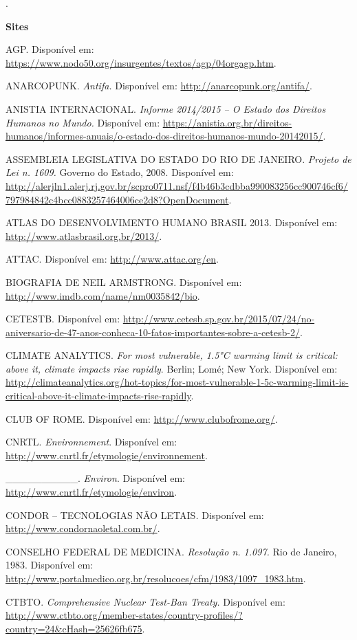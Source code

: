 .

\textbf{Sites}

AGP. Disponível em:
\href{https://www.nodo50.org/insurgentes/textos/agp/04orgagp.htm}{{https://www.nodo50.org/insurgentes/textos/agp/04orgagp.htm}}.

ANARCOPUNK. \emph{Antifa.} Disponível em:
\url{http://anarcopunk.org/antifa/}.

ANISTIA INTERNACIONAL. \emph{Informe 2014/2015 -- O Estado dos Direitos
Humanos no Mundo.} Disponível em:
\url{https://anistia.org.br/direitos-humanos/informes-anuais/o-estado-dos-direitos-humanos-mundo-20142015/}.

ASSEMBLEIA LEGISLATIVA DO ESTADO DO RIO DE JANEIRO. \emph{Projeto de Lei
n. 1609.} Governo do Estado, 2008. Disponível em:
\url{http://alerjln1.alerj.rj.gov.br/scpro0711.nsf/f4b46b3cdbba990083256cc900746cf6/797984842c4bcc0883257464006ce2d8?OpenDocument}.

ATLAS DO DESENVOLVIMENTO HUMANO BRASIL 2013. Disponível em:
\url{http://www.atlasbrasil.org.br/2013/}.

ATTAC. Disponível em: \url{http://www.attac.org/en}.

BIOGRAFIA DE NEIL ARMSTRONG. Disponível em:
\url{http://www.imdb.com/name/nm0035842/bio}.

CETESTB. Disponível em:
\url{http://www.cetesb.sp.gov.br/2015/07/24/no-aniversario-de-47-anos-conheca-10-fatos-importantes-sobre-a-cetesb-2/}.

CLIMATE ANALYTICS. \emph{For most vulnerable, 1.5°C warming limit is
critical: above it, climate impacts rise rapidly}. Berlin; Lomé; New
York. Disponível em:
\url{http://climateanalytics.org/hot-topics/for-most-vulnerable-1-5c-warming-limit-is-critical-above-it-climate-impacts-rise-rapidly}.

CLUB OF ROME. Disponível em: \url{http://www.clubofrome.org/}.

CNRTL. \emph{Environnement}. Disponível em:
\url{http://www.cnrtl.fr/etymologie/environnement}.

\_\_\_\_\_\_\_\_\_\_. \emph{Environ}. Disponível em:
\url{http://www.cnrtl.fr/etymologie/environ}.

CONDOR -- TECNOLOGIAS NÃO LETAIS\emph{.} Disponível em:
\url{http://www.condornaoletal.com.br/}.

CONSELHO FEDERAL DE MEDICINA. \emph{Resolução n. 1.097.} Rio de Janeiro,
1983. Disponível em:
\url{http://www.portalmedico.org.br/resolucoes/cfm/1983/1097_1983.htm}.

CTBTO. \emph{Comprehensive Nuclear Test-Ban Treaty.} Disponível em:
\url{http://www.ctbto.org/member-states/country-profiles/?country=24\&cHash=25626fb675}.

